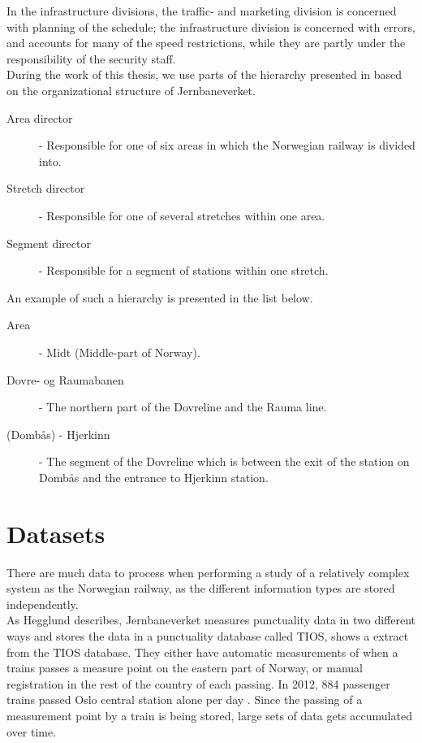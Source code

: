 In the infrastructure divisions, the traffic- and marketing division is
concerned with planning of the schedule; the infrastructure division is
concerned with errors, and accounts for many of the speed restrictions, while
they are partly under the responsibility of the security staff.\\


During the work of this thesis, we use parts of the hierarchy presented in 
 based on the organizational structure of Jernbaneverket.
\begin{description}
	\item [Area director] - Responsible for one of six areas in which the 
	Norwegian railway is divided into.
	\item [Stretch director] - Responsible for one of several stretches within 
	one area.
	\item [Segment director] - Responsible for a segment of stations within one stretch.
\end{description}

\bigskip\bigskip\bigskip
An example of such a hierarchy is presented in the list below.

\begin{description}
	\item [Area] - Midt (Middle-part of Norway).
	\item [Dovre- og Raumabanen] - The northern part of the Dovreline and the
	Rauma line.
	\item [(Dombås) - Hjerkinn] - The segment of the Dovreline which is 
	between the exit of the station on Dombås and the entrance to Hjerkinn
	station.
\end{description}


\section{Datasets} %
\label{sec:back_data_sets}
There are much data to process when performing a study of a relatively complex 
system as the Norwegian railway, as the different information types are stored
independently.\\

As Hegglund\cite[pp. 10-11]{hegglundPunklighetsdataIJernbanetraffik} describes,
Jernbaneverket measures punctuality data in two different ways and stores the
data in a punctuality database called TIOS,  shows a extract from the TIOS database. They either have automatic measurements of when a 
trains passes a measure point on the eastern part of Norway, or manual 
registration in the rest of the country of each passing. In 2012,  884 passenger trains passed Oslo central station alone per day \cite[p. 12]{jernbaneverketStatistikk}.
Since the passing of a measurement point by a train is being stored, large sets
of data gets accumulated over time.

